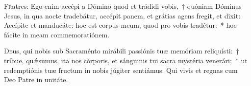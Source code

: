 \documentclass[vesperale_romanum.tex]{subfiles}
\begin{document}


 \label{1_vesperis_cc}







 
 

\label{115_3a2} 

\label{127_4E} 

\label{147_5} 

\capitulum


\lettrine{F}{r}atres: Ego enim accépi a Dómino quod et trádidi vobis,~† quóniam Dóminus Jesus, in qua nocte tradebátur, accépit panem, et grátias agens fregit, et dixit: Accípite et manducáte: hoc est corpus meum, quod pro vobis tradétur:~* hoc fácite in meam commemoratiónem.

 \label{hy_pange_lingua_corpus_christi_solesmes}




\admagnificat


\oratio \label{or_corpus_christi}

\lettrine{D}{e}us, qui nobis sub Sacraménto mirábili passiónis tuæ memóriam reliquísti:~† tríbue, quǽsumus, ita nos córporis, et sánguinis tui sacra mystéria venerári;~* ut redemptiónis tuæ fructum in nobis júgiter sentiámus. Qui vivis et regnas cum Deo Patre in unitáte.
\end{document}
